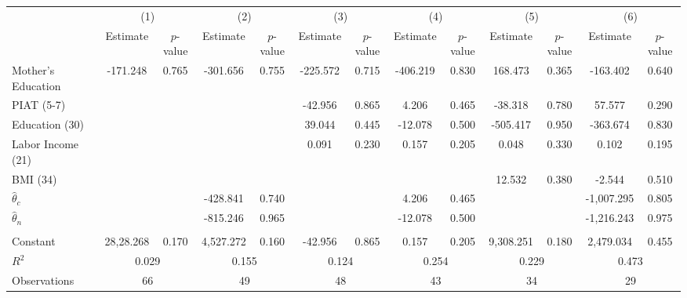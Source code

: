 \begin{tabular}{lcccccccccccc} \toprule
 & \multicolumn{2}{c}{(1)}  &  \multicolumn{2}{c}{(2)}  &  \multicolumn{2}{c}{(3)}  &  \multicolumn{2}{c}{(4)}  & \multicolumn{2}{c}{(5)} & \multicolumn{2}{c}{(6)} \\  
 & Estimate & $p$-value & Estimate & $p$-value & Estimate & $p$-value & Estimate & $p$-value & Estimate & $p$-value & Estimate & $p$-value \\ \midrule
Mother's Education &  -171.248 &     0.765 &  -301.656 &     0.755 &  -225.572 &     0.715 &  -406.219 &     0.830 &   168.473 &     0.365 &  -163.402 &     0.640 \\  
PIAT (5-7) &         &         &         &         &   -42.956 &     0.865 &     4.206 &     0.465 &   -38.318 &     0.780 &    57.577 &     0.290 \\  
Education (30) &         &         &         &         &    39.044 &     0.445 &   -12.078 &     0.500 &  -505.417 &     0.950 &  -363.674 &     0.830 \\  
Labor Income (21) &         &         &         &         &     0.091 &     0.230 &     0.157 &     0.205 &     0.048 &     0.330 &     0.102 &     0.195 \\  
BMI (34) &         &         &         &         &         &         &         &         &    12.532 &     0.380 &    -2.544 &     0.510 \\  
$\hat{\theta}_{c}$ &         &         &  -428.841 &     0.740 &         &         &     4.206 &     0.465 &         &         & -1,007.295 &     0.805 \\  
$\hat{\theta}_{n}$ &         &         &  -815.246 &     0.965 &         &         &   -12.078 &     0.500 &         &         & -1,216.243 &     0.975 \\  \\ \midrule
Constant &  28,28.268 &     0.170 &  4,527.272 &     0.160 &   -42.956 &     0.865 &     0.157 &     0.205 &  9,308.251 &     0.180 &  2,479.034 &     0.455 \\  
$R^2$ &     \multicolumn{2}{c}{0.029}  &     \multicolumn{2}{c}{0.155}  &     \multicolumn{2}{c}{0.124}   &     \multicolumn{2}{c}{0.254}  &     \multicolumn{2}{c}{0.229}  &     \multicolumn{2}{c}{0.473}  \\  
Observations &    \multicolumn{2}{c}{66}  &    \multicolumn{2}{c}{49} &    \multicolumn{2}{c}{48}  &    \multicolumn{2}{c}{43} &    \multicolumn{2}{c}{34}  &   \multicolumn{2}{c}{29}  \\  
\bottomrule \end{tabular} 
